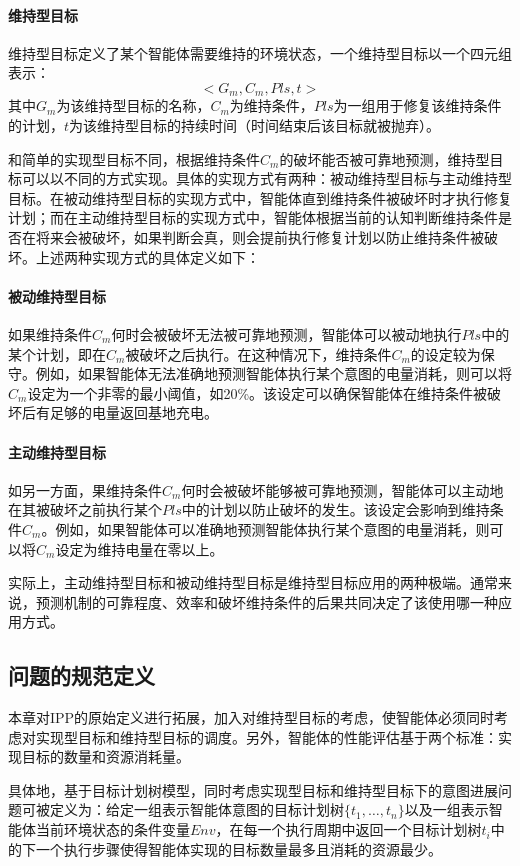 \paragraph{维持型目标}
维持型目标定义了某个智能体需要维持的环境状态\cite{DBLP:journals/ci/DuffTH14}，一个维持型目标以一个四元组表示：
$$<G_m,C_m,Pls,t>$$
其中$G_m$为该维持型目标的名称，$C_m$为维持条件，$Pls$为一组用于修复该维持条件的计划，$t$为该维持型目标的持续时间（时间结束后该目标就被抛弃）。

和简单的实现型目标不同，根据维持条件$C_m$的破坏能否被可靠地预测，维持型目标可以以不同的方式实现。具体的实现方式有两种：被动维持型目标与主动维持型目标。在被动维持型目标的实现方式中，智能体直到维持条件被破坏时才执行修复计划；而在主动维持型目标的实现方式中，智能体根据当前的认知判断维持条件是否在将来会被破坏，如果判断会真，则会提前执行修复计划以防止维持条件被破坏。上述两种实现方式的具体定义如下：
\paragraph{被动维持型目标}
如果维持条件$C_m$何时会被破坏无法被可靠地预测，智能体可以被动地执行$Pls$中的某个计划，即在$C_m$被破坏之后执行。在这种情况下，维持条件$C_m$的设定较为保守。例如，如果智能体无法准确地预测智能体执行某个意图的电量消耗，则可以将$C_m$设定为一个非零的最小阈值，如20\%。该设定可以确保智能体在维持条件被破坏后有足够的电量返回基地充电。
\paragraph{主动维持型目标}
如另一方面，果维持条件$C_m$何时会被破坏能够被可靠地预测，智能体可以主动地在其被破坏之前执行某个$Pls$中的计划以防止破坏的发生。该设定会影响到维持条件$C_m$。例如，如果智能体可以准确地预测智能体执行某个意图的电量消耗，则可以将$C_m$设定为维持电量在零以上。

实际上，主动维持型目标和被动维持型目标是维持型目标应用的两种极端。通常来说，预测机制的可靠程度、效率和破坏维持条件的后果共同决定了该使用哪一种应用方式。

\subsection{问题的规范定义}
本章对IPP的原始定义进行拓展，加入对维持型目标的考虑，使智能体必须同时考虑对实现型目标和维持型目标的调度。另外，智能体的性能评估基于两个标准：实现目标的数量和资源消耗量。

具体地，基于目标计划树模型，同时考虑实现型目标和维持型目标下的意图进展问题可被定义为：给定一组表示智能体意图的目标计划树$\{t_1, \dots, t_n\}$以及一组表示智能体当前环境状态的条件变量$Env$，在每一个执行周期中返回一个目标计划树$t_i$中的下一个执行步骤使得智能体实现的目标数量最多且消耗的资源最少。

